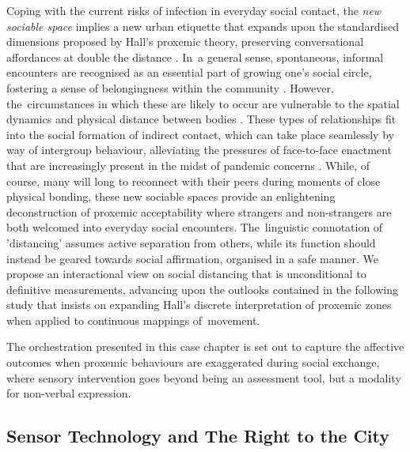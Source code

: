 {Coping with the current risks of infection in everyday social contact, the \textit{new sociable space} implies a new urban etiquette that expands upon the standardised dimensions proposed by Hall's proxemic theory, preserving conversational affordances at double the distance \citep{mehta_new_2020}. In~a general sense, spontaneous, informal encounters are recognised as an essential part of growing one's social circle, fostering a sense of belongingness within the community \citep{ye_ambivalence_2016}. However, the~circumstances in which these are likely to occur are vulnerable to the spatial dynamics and physical distance between bodies \citep{van_den_berg_subjective_2017, fayard_photocopiers_2007}. These types of relationships fit into the social formation of indirect contact, which can take place seamlessly by way of intergroup behaviour, alleviating the pressures of face-to-face enactment \citep{white_beyond_2021} that are increasingly present in the midst of pandemic concerns \citep{durnova_intimacy_2021}. While, of course, many will long to reconnect with their peers during moments of close physical bonding, these new sociable spaces provide an enlightening deconstruction of proxemic acceptability where strangers and non-strangers are both welcomed into everyday social encounters. The~linguistic connotation of 'distancing' assumes active separation from others, while its function should instead be geared towards social affirmation, organised in a safe manner. We propose an interactional view on social distancing that is unconditional to definitive measurements, advancing upon the outlooks contained in the following study \citep{ballendat_proxemic_2010} that insists on expanding Hall's discrete interpretation of proxemic zones when applied to continuous mappings of~movement.

The orchestration presented in this case chapter is set out to capture the affective outcomes when proxemic behaviours are exaggerated during social exchange, where sensory intervention goes beyond being an assessment tool, but a modality for non-verbal expression.

\subsection*{Sensor Technology and The Right to the City}
\label{subsec:shift}

}

